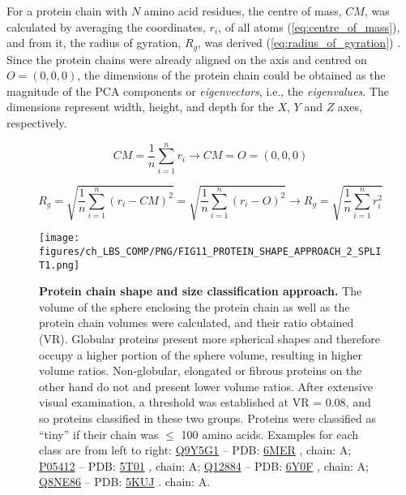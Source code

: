For a protein chain with $N$ amino acid residues, the centre of mass, $CM$, was calculated by averaging the coordinates, $r_{i}$, of all atoms (\autoref{eq:centre_of_mass}), and from it, the radius of gyration, $R_{g}$, was derived (\autoref{eq:radius_of_gyration}) \cite{FIXMAN_1962_ROG}. Since the protein chains were already aligned on the axis and centred on $O = (0, 0, 0)$, the dimensions of the protein chain could be obtained as the magnitude of the PCA components or \textit{eigenvectors}, i.e., the \textit{eigenvalues}. The dimensions represent width, height, and depth for the $X$, $Y$ and $Z$ axes, respectively.

\begin{equation}
CM = \frac{1}{n} \sum_{i=1}^{n} r_i \rightarrow CM = O = (0,0,0)
\label{eq:centre_of_mass}
\end{equation}

\begin{equation}
R_g = \sqrt{\frac{1}{n} \sum_{i=1}^{n} (r_i - CM)^2} = \sqrt{\frac{1}{n} \sum_{i=1}^{n} (r_i - O)^2} \rightarrow R_g = \sqrt{\frac{1}{n} \sum_{i=1}^{n} r_i^2}
\label{eq:radius_of_gyration}
\end{equation}

\begin{figure}[htb!]
    \centering
    \texttt{[image: figures/ch\_LBS\_COMP/PNG/FIG11\_PROTEIN\_SHAPE\_APPROACH\_2\_SPLIT1.png]}
    \caption[Protein chain shape and size classification approach]{\textbf{Protein chain shape and size classification approach.} The volume of the sphere enclosing the protein chain as well as the protein chain volumes were calculated, and their ratio obtained (VR). Globular proteins present more spherical shapes and therefore occupy a higher portion of the sphere volume, resulting in higher volume ratios. Non-globular, elongated or fibrous proteins on the other hand do not and present lower volume ratios. After extensive visual examination, a threshold was established at VR = 0.08, and so proteins classified in these two groups. Proteins were classified as ``tiny'' if their chain was $\leq$ 100 amino acids. Examples for each class are from left to right: \href{https://www.uniprot.org/uniprotkb/Q9Y5G1/entry}{Q9Y5G1} -- PDB: \href{https://www.ebi.ac.uk/pdbe/entry/pdb/6mer}{6MER} \cite{NICLOLUDIS_2019_CADH}, chain: A; \href{https://www.uniprot.org/uniprotkb/P05412/entry}{P05412} -- PDB: \href{https://www.ebi.ac.uk/pdbe/entry/pdb/5t01}{5T01} \cite{HONG_2017_EPSTEINBARR}, chain: A; \href{https://www.uniprot.org/uniprotkb/Q12884/entry}{Q12884} -- PDB: \href{https://www.ebi.ac.uk/pdbe/entry/pdb/6Y0F}{6Y0F} \cite{PDB_6Y0F}, chain: A; \href{https://www.uniprot.org/uniprotkb/Q8NE86/entry}{Q8NE86} -- PDB: \href{https://www.ebi.ac.uk/pdbe/entry/pdb/5KUJ}{5KUJ} \cite{LEE_2016_CALCIUM}. chain: A.}
    \label{fig:protein_class_approach}
\end{figure}

